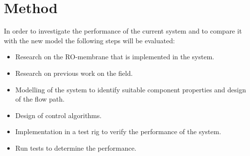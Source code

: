 \section{Method}

In order to investigate the performance of the current system and to compare it with the new model the following steps will be evaluated:

\begin{itemize}
\renewcommand\labelitemi{-}
    \item Research on the RO-membrane that is implemented in the system.
    \item Research on previous work on the field.
    \item Modelling of the system to identify suitable component properties and design of the flow path.
    \item Design of control algorithms.
    \item Implementation in a test rig to verify the performance of the system.
    \item Run tests to determine the performance.
\end{itemize}




